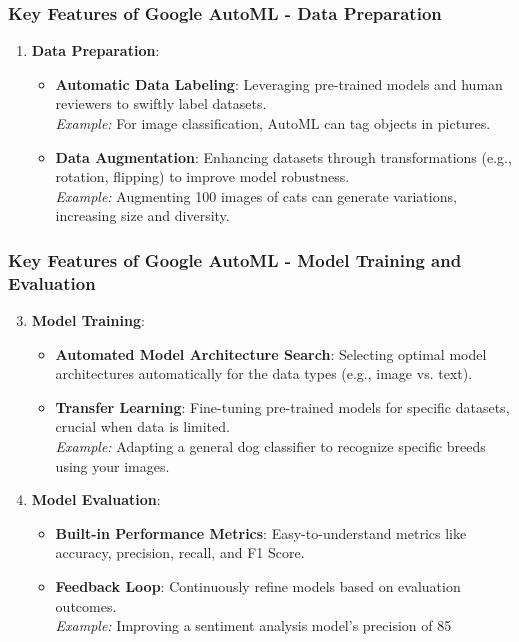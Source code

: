 \documentclass[aspectratio=169]{beamer}
\begin{document}
\begin{frame}[fragile]
    \frametitle{Key Features of Google AutoML - Data Preparation}
    \begin{enumerate}
        \item \textbf{Data Preparation}:
        \begin{itemize}
            \item \textbf{Automatic Data Labeling}: Leveraging pre-trained models and human reviewers to swiftly label datasets.\\
            \textit{Example:} For image classification, AutoML can tag objects in pictures.
            
            \item \textbf{Data Augmentation}: Enhancing datasets through transformations (e.g., rotation, flipping) to improve model robustness.\\
            \textit{Example:} Augmenting 100 images of cats can generate variations, increasing size and diversity.
        \end{itemize}
    \end{enumerate}
\end{frame}

\begin{frame}[fragile]
    \frametitle{Key Features of Google AutoML - Model Training and Evaluation}
    \begin{enumerate}
        \setcounter{enumi}{2}
        \item \textbf{Model Training}:
        \begin{itemize}
            \item \textbf{Automated Model Architecture Search}: Selecting optimal model architectures automatically for the data types (e.g., image vs. text).
            \item \textbf{Transfer Learning}: Fine-tuning pre-trained models for specific datasets, crucial when data is limited.\\
            \textit{Example:} Adapting a general dog classifier to recognize specific breeds using your images.
        \end{itemize}

        \item \textbf{Model Evaluation}:
        \begin{itemize}
            \item \textbf{Built-in Performance Metrics}: Easy-to-understand metrics like accuracy, precision, recall, and F1 Score.
            \item \textbf{Feedback Loop}: Continuously refine models based on evaluation outcomes.\\
            \textit{Example:} Improving a sentiment analysis model's precision of 85%
        \end{itemize}
    \end{enumerate}
\end{frame}
\end{document}
